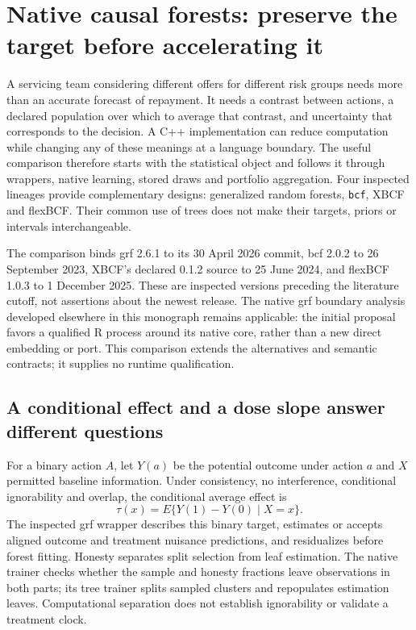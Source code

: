 \section{Native causal forests: preserve the target before accelerating it}
\label{exec21:cxx-scope}
A servicing team considering different offers for different risk groups needs more than an accurate forecast of repayment. It needs a contrast between actions, a declared population over which to average that contrast, and uncertainty that corresponds to the decision. A C++ implementation can reduce computation while changing any of these meanings at a language boundary. The useful comparison therefore starts with the statistical object and follows it through wrappers, native learning, stored draws and portfolio aggregation. Four inspected lineages provide complementary designs: generalized random forests, \texttt{bcf}, XBCF and flexBCF. Their common use of trees does not make their targets, priors or intervals interchangeable.~\citep{exec21_cxx_grf,exec21_cxx_bcf,exec21_cxx_xbcf,exec21_cxx_flexbcf}

The comparison binds grf 2.6.1 to its 30 April 2026 commit, bcf 2.0.2 to 26 September 2023, XBCF's declared 0.1.2 source to 25 June 2024, and flexBCF 1.0.3 to 1 December 2025. These are inspected versions preceding the literature cutoff, not assertions about the newest release. The native grf boundary analysis developed elsewhere in this monograph remains applicable: the initial proposal favors a qualified R process around its native core, rather than a new direct embedding or port. This comparison extends the alternatives and semantic contracts; it supplies no runtime qualification.~\citep{exec21_cxx_grf,exec21_cxx_bcf,exec21_cxx_xbcf,exec21_cxx_flexbcf}

\subsection{A conditional effect and a dose slope answer different questions}
\label{exec21:cxx-target}
For a binary action $A$, let $Y(a)$ be the potential outcome under action $a$ and $X$ permitted baseline information. Under consistency, no interference, conditional ignorability and overlap, the conditional average effect is
\begin{equation}
 \tau(x)=E\{Y(1)-Y(0)\mid X=x\}.
 \label{exec21:cxx-cate}
\end{equation}
The inspected grf wrapper describes this binary target, estimates or accepts aligned outcome and treatment nuisance predictions, and residualizes before forest fitting. Honesty separates split selection from leaf estimation. The native trainer checks whether the sample and honesty fractions leave observations in both parts; its tree trainer splits sampled clusters and repopulates estimation leaves. Computational separation does not establish ignorability or validate a treatment clock.~\citep{exec21_cxx_grf}

